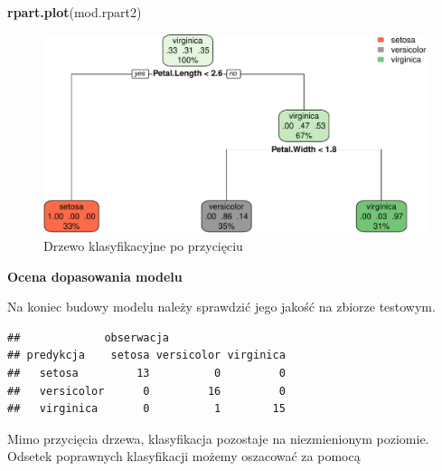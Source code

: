 \documentclass[]{book}
\newenvironment{Shaded}{\begin{snugshade}}{\end{snugshade}}
\newcommand{\DataTypeTok}[1]{\textcolor[rgb]{0.13,0.29,0.53}{#1}}
\newcommand{\KeywordTok}[1]{\textcolor[rgb]{0.13,0.29,0.53}{\textbf{#1}}}
\newcommand{\NormalTok}[1]{#1}
\newcommand{\OperatorTok}[1]{\textcolor[rgb]{0.81,0.36,0.00}{\textbf{#1}}}
\newcommand{\StringTok}[1]{\textcolor[rgb]{0.31,0.60,0.02}{#1}}
\theoremstyle{plain}
\theoremstyle{definition}
\theoremstyle{definition}
\theoremstyle{definition}
\theoremstyle{definition}
\theoremstyle{remark}
\begin{document}
\begin{Shaded}
\begin{Highlighting}[]
\KeywordTok{rpart.plot}\NormalTok{(mod.rpart2)}
\end{Highlighting}
\end{Shaded}

\begin{figure}
\centering
\includegraphics{EksploracjaDanych_files/figure-latex/unnamed-chunk-18-1.pdf}
\caption{\label{fig:unnamed-chunk-18}Drzewo klasyfikacyjne po przycięciu}
\end{figure}

\textbf{Ocena dopasowania modelu}

Na koniec budowy modelu należy sprawdzić jego jakość na zbiorze testowym.

\begin{Shaded}
\end{Shaded}

\begin{verbatim}
##             obserwacja
## predykcja    setosa versicolor virginica
##   setosa         13          0         0
##   versicolor      0         16         0
##   virginica       0          1        15
\end{verbatim}

Mimo przycięcia drzewa, klasyfikacja pozostaje na niezmienionym poziomie. Odsetek poprawnych klasyfikacji możemy oszacować za pomocą
\end{document}
